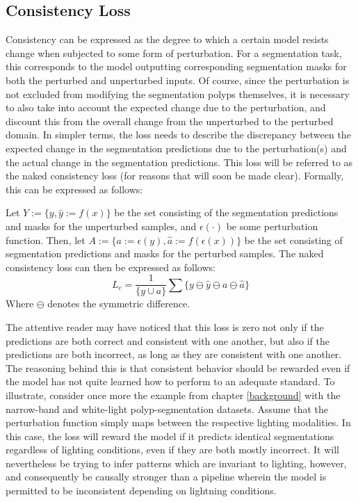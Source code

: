 	\subsection{Consistency Loss}
	Consistency can be expressed as the degree to which a certain model resists change when subjected to some form of perturbation. For a segmentation task, this corresponds to the model outputting corresponding segmentation masks for both the perturbed and unperturbed inputs. Of course, since the perturbation is not excluded from modifying the segmentation polyps themselves, it is necessary to also take into account the expected change due to the perturbation, and discount this from the overall change from the unperturbed to the perturbed domain. In simpler terms, the loss needs to describe the discrepancy between the expected change in the segmentation predictions due to the perturbation(s) and the actual change in the segmentation predictions. This loss will be referred to as the naked consistency loss (for reasons that will soon be made clear). Formally, this can be expressed as follows:

	Let \(Y:=\{y,\hat{y}:=f(x)\}\) be the set consisting of the segmentation predictions and masks for the unperturbed samples, and \(\epsilon(\cdot)\) be some perturbation function. Then, let \(A:=\{a:=\epsilon(y),\hat{a}:=f(\epsilon(x))\}\) be the set consisting of segmentation predictions and masks for the perturbed samples. The naked consistency loss can then be expressed as follows: 
	\begin{equation}
		L_c = \frac{1}{\{y \cup a \}} \sum \{y\ominus\hat{y}\ominus a\ominus\hat{a}\}
	\end{equation}
	Where \(\ominus \) denotes the symmetric difference. 
	
	The attentive reader may have noticed that this loss is zero not only if the predictions are both correct and consistent with one another, but also if the predictions are both incorrect, as long as they are consistent with one another. The reasoning behind this is that consistent behavior should be rewarded even if the model has not quite learned how to perform to an adequate standard. To illustrate, consider once more the example from chapter \ref{background} with the narrow-band and white-light polyp-segmentation datasets. Assume that the perturbation function simply maps between the respective lighting modalities. In this case, the loss will reward the model if it predicts identical segmentations regardless of lighting conditions, even if they are both mostly incorrect. It will nevertheless be trying to infer patterns which are invariant to lighting, however, and consequently be causally stronger than a pipeline wherein the model is permitted to be inconsistent depending on lightning conditions. 
	
